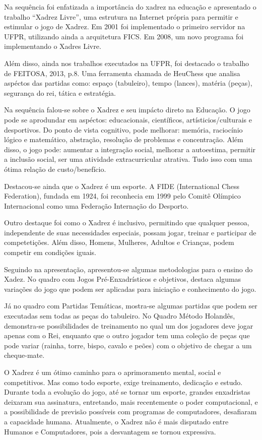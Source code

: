 Na sequência foi enfatizada a importância do xadrez na educação e apresentado o trabalho ``Xadrez Livre'', uma estrutura na Internet própria para permitir e estimular o jogo de Xadrez. Em 2001 foi implementado o primeiro servidor na UFPR, utilizando ainda a arquitetura FICS. Em 2008, um novo programa foi implementando o Xadres Livre.

Além disso, ainda nos trabalhos executados na UFPR, foi destacado o trabalho de FEITOSA, 2013, p.8. Uma ferramenta chamada de HeuChess que analisa aspéctos das partidas como: espaço (tabuleiro), tempo (lances), matéria (peças), segurança do rei, tática e estratégia.

Na sequência falou-se sobre o Xadrez e seu impácto direto na Educação. O jogo pode se aprodundar em aspéctos: educacionais, científicos, artísticios/culturais e desportivos. Do ponto de vista cognitivo, pode melhorar: memória, raciocínio lógico e matemático, abstração, resolução de problemas e concentração. Além disso, o jogo pode: aumentar a integração social, melhorar a autoestima, permitir a inclusão social, ser uma atividade extracurricular atrativa. Tudo isso com uma ótima relação de custo/benefício.

Destacou-se ainda que o Xadrez é um esporte. A FIDE (International Chess Federation), fundada em 1924, foi reconhecia em 1999 pelo Comitê Olímpico Internacional como uma Federação Internação do Desporto.

Outro destaque foi como o Xadrez é inclusivo, permitindo que qualquer pessoa, independente de suas necessidades especiais, possam jogar, treinar e participar de competetições. Além disso, Homens, Mulheres, Adultos e Crianças, podem competir em condições iguais.

Seguindo na apresentação, apresentou-se algumas metodologias para o ensino do Xadez. No quadro com Jogos Pré-Enxadrísticos e objetivos, destaca algumas variações do jogo que podem ser aplicadas para iniciação e conhecimento do jogo.

Já no quadro com Partidas Temáticas, mostra-se algumas partidas que podem ser executadas sem todas as peças do tabuleiro. No Quadro Método Holandês, demonstra-se possibilidades de treinamento no qual um dos jogadores deve jogar apenas com o Rei, enquanto que o outro jogador tem uma coleção de peças que pode variar (rainha, torre, bispo, cavalo e peões) com o objetivo de chegar a um cheque-mate.

O Xadrez é um ótimo caminho para o aprimoramento mental, social e competitivos. Mas como todo esporte, exige treinamento, dedicação e estudo. Durante toda a evolução do jogo, até se tornar um esporte, grandes enxadristas deixaram sua assinatura, entretando, mais recentemente o poder computacional, e a possibilidade de previsão possíveis com programas de computadores, desafiaram a capacidade humana. Atualmente, o Xadrez não é mais disputado entre Humanos e Computadores, pois a desvantagem se tornou expressiva.